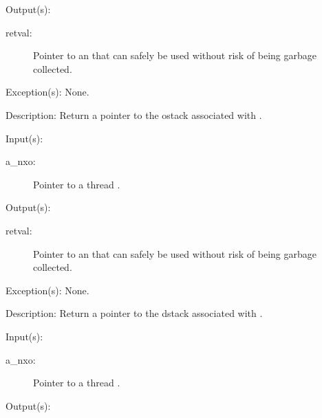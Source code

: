 \begin{capi}
\begin{capilist}
\begin{description}
		\end{description}
	\item[Output(s): ]
		\begin{description}\item[]
		\item[retval: ]
			Pointer to an  that can safely be used
			without risk of being garbage collected.
		\end{description}
	\item[Exception(s): ] None.
	\item[Description: ]
		Return a pointer to the ostack associated with .
	\end{capilist}
\label{nxo_thread_dstack_get}
	\begin{capilist}
	\item[Input(s): ]
		\begin{description}\item[]
		\item[a\_nxo: ]
			Pointer to a thread .
		\end{description}
	\item[Output(s): ]
		\begin{description}\item[]
		\item[retval: ]
			Pointer to an  that can safely be used
			without risk of being garbage collected.
		\end{description}
	\item[Exception(s): ] None.
	\item[Description: ]
		Return a pointer to the dstack associated with .
	\end{capilist}
\label{nxo_thread_estack_get}
	\begin{capilist}
	\item[Input(s): ]
		\begin{description}\item[]
		\item[a\_nxo: ]
			Pointer to a thread \classname{nxo}.
		\end{description}
	\item[Output(s): ]
		\begin{description}\item[]

\end{description}
\end{capilist}
\end{capi}
